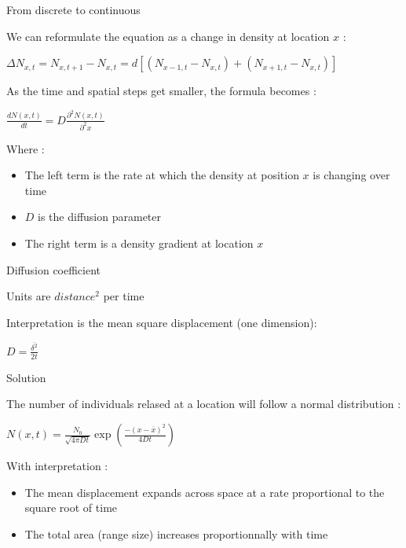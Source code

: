 \documentclass[10pt,aspectratio=149]{beamer}
\newcommand{\keyeq}[1]{%
  \begin{center}
    \Large$\displaystyle #1$
  \end{center}%
}
\begin{document}
\begin{frame}{From discrete to continuous}

    We can reformulate the equation as a change in density at location $x$ : 

    \keyeq{\Delta N_{x,t}= N_{x, t+1}-N_{x, t} = d[(N_{x-1, t}-N_{x, t}) + (N_{x+1, t}-N_{x, t})]}
    
    As the time and spatial steps get smaller, the formula becomes : 
    
    \keyeq{\frac{dN(x,t)}{dt} = D \frac{\partial^2N(x,t)}{\partial^2 x}}
    
    Where : 
    \begin{itemize}
        \item The left term is the rate at which the density at position $x$ is changing over time
        \item $D$ is the diffusion parameter
        \item The right term is a density gradient at location $x$
    \end{itemize}
    
\end{frame}
    

\begin{frame}{Diffusion coefficient}

    Units are $distance^2$ per time

    Interpretation is the mean square displacement (one dimension): 
    
    \keyeq{D = \frac{\overline{\delta^2}}{2t}}
    
\end{frame}
    

\begin{frame}{Solution}

    The number of individuals relased at a location will follow a normal distribution : 

    \keyeq{N(x,t) = \frac{N_0}{\sqrt{4\pi D t}}\exp\left(\frac{-(x-\overline{x})^2}{4Dt}\right)}
    
    With interpretation : 
    \begin{itemize}
        \item The mean displacement expands across space at a rate proportional to the square root of time
        \item The total area (range size) increases proportionnally with time
    \end{itemize}
    
\end{frame}
    
\end{document}
